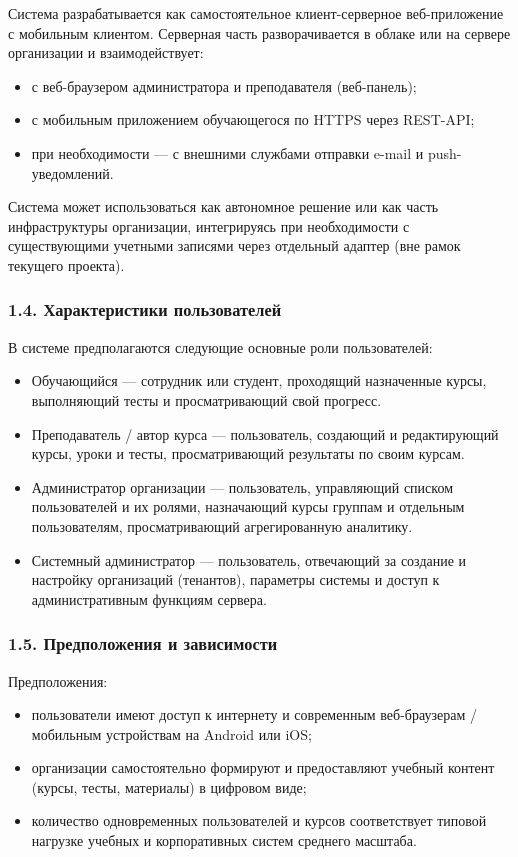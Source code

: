 \documentclass{G7-32}
\begin{document}
Система разрабатывается как самостоятельное клиент-серверное веб-приложение с мобильным клиентом. Серверная часть разворачивается в облаке или на сервере организации и взаимодействует:
\begin{itemize}
  \item с веб-браузером администратора и преподавателя (веб-панель);
  \item с мобильным приложением обучающегося по HTTPS через REST-API;
  \item при необходимости — с внешними службами отправки e-mail и push-уведомлений.
\end{itemize}

Система может использоваться как автономное решение или как часть инфраструктуры организации, интегрируясь при необходимости с существующими учетными записями через отдельный адаптер (вне рамок текущего проекта).

\subsubsection*{1.4. Характеристики пользователей}

В системе предполагаются следующие основные роли пользователей:
\begin{itemize}
  \item Обучающийся — сотрудник или студент, проходящий назначенные курсы, выполняющий тесты и просматривающий свой прогресс.
  \item Преподаватель / автор курса — пользователь, создающий и редактирующий курсы, уроки и тесты, просматривающий результаты по своим курсам.
  \item Администратор организации — пользователь, управляющий списком пользователей и их ролями, назначающий курсы группам и отдельным пользователям, просматривающий агрегированную аналитику.
  \item Системный администратор — пользователь, отвечающий за создание и настройку организаций (тенантов), параметры системы и доступ к административным функциям сервера.
\end{itemize}

\subsubsection*{1.5. Предположения и зависимости}

Предположения:
\begin{itemize}
  \item пользователи имеют доступ к интернету и современным веб-браузерам / мобильным устройствам на Android или iOS;
  \item организации самостоятельно формируют и предоставляют учебный контент (курсы, тесты, материалы) в цифровом виде;
  \item количество одновременных пользователей и курсов соответствует типовой нагрузке учебных и корпоративных систем среднего масштаба.
\end{itemize}
\end{document}
